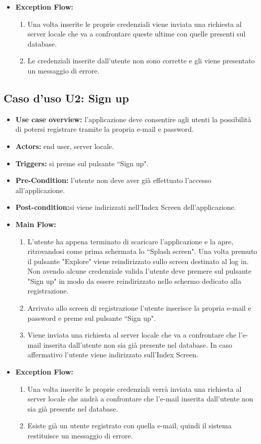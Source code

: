 \begin{itemize}
    \item \textbf{Exception Flow:}\begin{enumerate}
              \item Una volta inserite le proprie credenziali viene inviata una richiesta al server locale che va a confrontare queste ultime con quelle presenti sul database.
              \item Le credenziali inserite dall'utente non sono corrette e gli viene presentato un messaggio di errore. \end{enumerate}
\end{itemize}
\subsection*{Caso d'uso U2: Sign up}
\begin{itemize}
    \item  \textbf{Use case overview:} l'applicazione deve consentire agli utenti la possibilit\`a di potersi registrare tramite la propria e-mail e password.
    \item \textbf{Actors:} end user, server locale.
    \item \textbf{Triggers:} si preme sul pulsante ``Sign up".
    \item \textbf{Pre-Condition:} l'utente non deve aver gi\`a effettuato l'accesso all'applicazione.
    \item \textbf{Post-condition:}si viene indirizzati nell'Index Screen dell'applicazione.
    \item \textbf{Main Flow:} \begin{enumerate}
              \item L'utente ha appena terminato di scaricare l'applicazione e la apre, ritrovandosi come prima schermata lo ``Splash screen". Una volta premuto il pulsante "Explore" viene reindirizzato sullo screen destinato al log in. Non avendo alcune credenziale valida l'utente deve premere sul pulsante "Sign up" in modo da essere reindirizzato nello schermo dedicato alla registrazione.
              \item Arrivato allo screen di registrazione l'utente inserisce la propria e-mail e password e preme sul pulsante ``Sign up".
              \item Viene inviata una richiesta al server locale che va a confrontare che l'e-mail inserita dall'utente non sia gi\`a presente nel database. In caso affermativo l'utente viene indirizzato sull'Index Screen.

          \end{enumerate}

    \item \textbf{Exception Flow:}\begin{enumerate}
              \item Una volta inserite le proprie credenziali verr\`a inviata una richiesta al server locale che andr\`a a confrontare che l'e-mail inserita dall'utente non sia gi\`a presente nel database.
              \item Esiste gi\`a un utente registrato con quella e-mail, quindi il sistema restituisce un messaggio di errore. \end{enumerate}
\end{itemize}
